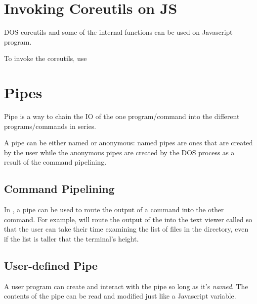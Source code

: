 \chapter{Invoking Coreutils on JS}

DOS coreutils and some of the internal functions can be used on Javascript program.

To invoke the coreutils, use 

\begin{outline}
\1
\1
\1
\1
\end{outline}



\chapter{Pipes}

Pipe is a way to chain the IO of the one program/command into the different programs/commands in series.

A pipe can be either named or anonymous: named pipes are ones that are created by the user while the anonymous pipes are created by the DOS process as a result of the command pipelining.

\section{Command Pipelining}

In \thedos, a pipe can be used to route the output of a command into the other command. For example,  will route the output of the  into the text viewer called  so that the user can take their time examining the list of files in the directory, even if the list is taller that the terminal's height.

\section{User-defined Pipe}

A user program can create and interact with the pipe so long as it's \emph{named}. The contents of the pipe can be read and modified just like a Javascript variable.

